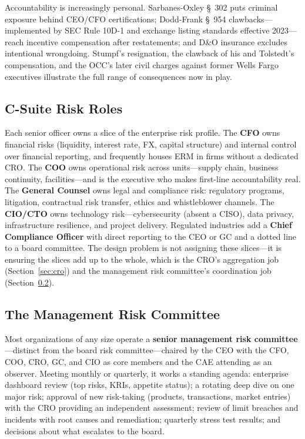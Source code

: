\documentclass[11pt,openany]{book}
\begin{document}
Accountability is increasingly personal. Sarbanes-Oxley \S~302 puts criminal
exposure behind CEO/CFO certifications; Dodd-Frank \S~954
clawbacks---implemented by SEC Rule 10D-1 and exchange listing standards
effective 2023---reach incentive compensation after restatements; and D\&O
insurance excludes intentional wrongdoing. Stumpf's resignation, the clawback
of his and Tolstedt's compensation, and the OCC's later civil charges against
former Wells Fargo executives illustrate the full range of consequences now
in play.

\subsection{C-Suite Risk Roles}

Each senior officer owns a slice of the enterprise risk profile. The
\textbf{CFO} owns financial risks (liquidity, interest rate, FX, capital
structure) and internal control over financial reporting, and frequently
houses ERM in firms without a dedicated CRO. The \textbf{COO} owns
operational risk across units---supply chain, business continuity,
facilities---and is the executive who makes first-line accountability real.
The \textbf{General Counsel} owns legal and compliance risk: regulatory
programs, litigation, contractual risk transfer, ethics and whistleblower
channels. The \textbf{CIO/CTO} owns technology risk---cybersecurity (absent a
CISO), data privacy, infrastructure resilience, and project delivery.
Regulated industries add a \textbf{Chief Compliance Officer} with direct
reporting to the CEO or GC and a dotted line to a board committee. The design
problem is not assigning these slices---it is ensuring the slices add up to
the whole, which is the CRO's aggregation job (Section~\ref{sec:cro}) and the
management risk committee's coordination job
(Section~\ref{subsec:mgmt-committee}).

\subsection{The Management Risk Committee}
\label{subsec:mgmt-committee}

Most organizations of any size operate a \textbf{senior management risk
committee}---distinct from the board risk committee---chaired by the CEO with
the CFO, COO, CRO, GC, and CIO as core members and the CAE attending as an
observer. Meeting monthly or quarterly, it works a standing agenda:
enterprise dashboard review (top risks, KRIs, appetite status); a rotating
deep dive on one major risk; approval of new risk-taking (products,
transactions, market entries) with the CRO providing an independent
assessment; review of limit breaches and incidents with root causes and
remediation; quarterly stress test results; and decisions about what
escalates to the board.
\end{document}
